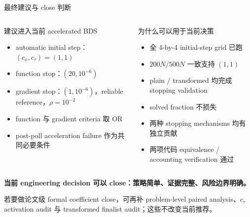 \documentclass[aspectratio=169,10pt]{beamer}
\newcommand{\tight}{\setlength{\itemsep}{0.35em}\setlength{\parskip}{0pt}}
\begin{document}
\begin{frame}{最终建议与 close 判断}
\small
\begin{columns}[T,onlytextwidth]
\begin{block}{建议进入当前 accelerated BDS}
\begin{itemize}\tight
  \item automatic initial step：$(c_x,c_\tau)=(1,1)$
  \item function stop：$(20,10^{-6})$
  \item gradient stop：$(1,10^{-6})$，reliable reference，$\rho=10^{-2}$
  \item function 与 gradient criteria 取 OR
  \item post-poll acceleration failure 作为共同必要条件
\end{itemize}
\end{block}

\begin{block}{为什么可以用于当前决策}
\begin{itemize}\tight
  \item 全 4-by-4 initial-step grid 已跑
  \item $200N/500N$ 一致支持 $(1,1)$
  \item plain / transformed 均完成 stopping validation
  \item solved fraction 不损失
  \item 两种 stopping mechanisms 均有独立贡献
  \item 两项代码 equivalence / accounting verification 通过
\end{itemize}
\end{block}
\end{columns}

\vfill
\centering
\colorbox{BDSBlue}{\parbox{0.93\textwidth}{\centering\color{white}
\bfseries 当前 engineering decision 可以 close：策略简单、证据完整、风险边界明确。\par
\normalfont\footnotesize 若要做论文级 formal coefficient close，可再补 problem-level paired analysis、$c_\tau$ activation audit 与 transformed finalist audit；这些不改变当前推荐。}}
\end{frame}
\end{document}

